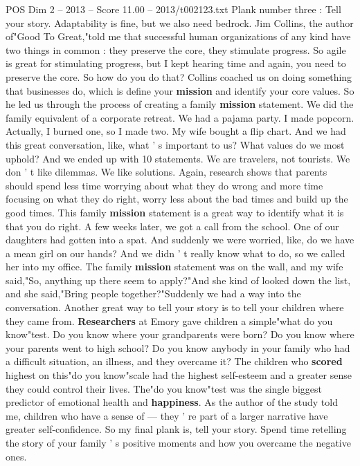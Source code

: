 \begin{textsample}{POS Dim 2 – 2013 – Score 11.00 – 2013/t002123.txt}
Plank number three : Tell your story.
Adaptability is fine, but we also need bedrock.
Jim Collins, the author of"Good To Great,"told me that successful human organizations of any kind have two things in common : they preserve the core, they stimulate progress.
So agile is great for stimulating progress, but I kept hearing time and again, you need to preserve the core.
So how do you do that?
Collins coached us on doing something that businesses do, which is define your \textbf{mission} and identify your core values.
So he led us through the process of creating a family \textbf{mission} statement.
We did the family equivalent of a corporate retreat.
We had a pajama party.
I made popcorn.
Actually, I burned one, so I made two.
My wife bought a flip chart.
And we had this great conversation, like, what ' s important to us?
What values do we most uphold?
And we ended up with 10 statements.
We are travelers, not tourists.
We don ' t like dilemmas.
We like solutions.
Again, research shows that parents should spend less time worrying about what they do wrong and more time focusing on what they do right, worry less about the bad times and build up the good times.
This family \textbf{mission} statement is a great way to identify what it is that you do right.
A few weeks later, we got a call from the school.
One of our daughters had gotten into a spat.
And suddenly we were worried, like, do we have a mean girl on our hands?
And we didn ' t really know what to do, so we called her into my office.
The family \textbf{mission} statement was on the wall, and my wife said,"So, anything up there seem to apply?"And she kind of looked down the list, and she said,"Bring people together?"Suddenly we had a way into the conversation.
Another great way to tell your story is to tell your children where they came from. \textbf{Researchers} at Emory gave children a simple"what do you know"test.
Do you know where your grandparents were born?
Do you know where your parents went to high school?
Do you know anybody in your family who had a difficult situation, an illness, and they overcame it?
The children who \textbf{scored} highest on this"do you know"scale had the highest self-esteem and a greater sense they could control their lives.
The"do you know"test was the single biggest predictor of emotional health and \textbf{happiness}.
As the author of the study told me, children who have a sense of — they ' re part of a larger narrative have greater self-confidence.
So my final plank is, tell your story.
Spend time retelling the story of your family ' s positive moments and how you overcame the negative ones.

\end{textsample}
